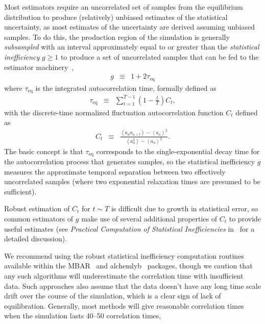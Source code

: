 \documentclass[9pt,bestpractices]{livecoms}
\newcommand{\expect}[1]{\left\langle{#1}\right\rangle}
\begin{document}
Most estimators require an uncorrelated set of samples from the equilibrium distribution to produce (relatively) unbiased estimates of the statistical uncertainty, as most estimates of the uncertainty are derived assuming unbiased samples.
To do this, the production region of the simulation is generally \emph{subsampled} with an interval approximately equal to or greater than the \emph{statistical inefficiency} $g \ge 1$ to produce a set of uncorrelated samples that can be fed to the estimator machinery~\cite{chodera2016simple},
\begin{eqnarray}
g &\equiv& 1 + 2 \tau_\mathrm{eq} \label{eq:statistical-inefficiency-definition}
\end{eqnarray}
where $\tau_\mathrm{eq}$ is the integrated autocorrelation time, formally defined as
\begin{eqnarray}
\tau_\mathrm{eq} &\equiv& \sum_{t=1}^{T-1} \left(1 - \frac{t}{T}\right) C_t \label{eq:integrated-autocorrelation-time-definition} , 
\end{eqnarray}
with the discrete-time normalized fluctuation autocorrelation function $C_t$ defined as
\begin{eqnarray}
C_t &\equiv& \frac{\expect{a_n a_{n+t}} - \expect{a_n}^2}{\expect{a_n^2} - \expect{a_n}^2} . \label{equation:autocorrelation-definition}
\end{eqnarray}
The basic concept is that $\tau_\mathrm{eq}$ corresponds to the single-exponential decay time for the autocorrelation process that generates samples, so the statistical inefficiency $g$ measures the approximate temporal separation between two effectively uncorrelated samples (where two exponential relaxation times are presumed to be sufficient).

Robust estimation of $C_t$ for $t \sim T$ is difficult due to growth in statistical error, so common estimators of $g$ make use of several additional properties of $C_t$ to provide useful estimates (see \emph{Practical Computation of Statistical Inefficiencies} in~\cite{chodera2016simple} for a detailed discussion).

We recommend using the robust statistical inefficiency computation routines available within the MBAR~\cite{kylebeauchamp2019choderalab} and alchemlyb~\cite{daviddotson2019alchemistry} packages, though we caution that any such algorithms will underestimate the correlation time with insufficient data. Such approaches also assume that the data doesn't have any long time scale drift over the course of the simulation, which is a clear sign of lack of equilibration.  Generally, most methods will give reasonable correlation times when the simulation lasts 40--50 correlation times,
\end{document}
